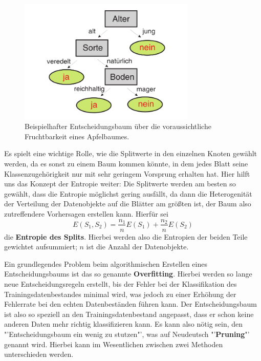 \begin{figure}[ht]
	\centering
	\includegraphics[width=0.75\textwidth]{Figures/decision_tree}
	\caption[Entscheidungsbaum Beispiel]{Beispielhafter Entscheidungsbaum über die
	voraussichtliche Fruchtbarkeit eines Apfelbaumes.\footnotemark}
	\label{fig:decision_tree}
\end{figure}

Es spielt eine wichtige Rolle, wie die Splitwerte in den einzelnen Knoten gewählt
werden, da es sonst zu einem Baum kommen könnte, in dem jedes Blatt seine 
Klassenzugehörigkeit nur mit sehr geringem Vorsprung erhalten hat. Hier hilft
uns das Konzept der Entropie weiter: Die Splitwerte werden am besten so gewählt, dass die
Entropie möglichst gering ausfällt, da dann die Heterogenität der Verteilung der
Datenobjekte auf die Blätter am größten ist, der Baum also zutreffendere Vorhersagen
erstellen kann. Hierfür sei
\[
	E(S_1, S_2) = \frac{n_1}{n} E(S_1) + \frac{n_2}{n} E(S_2)
\]
die \textbf{Entropie des Splits}. Hierbei werden also die Entropien der beiden
Teile gewichtet aufsummiert; \(n\) ist die Anzahl der Datenobjekte.

Ein grundlegendes Problem beim algorithmischen Erstellen eines Entscheidungsbaums
ist das so genannte \textbf{Overfitting}. Hierbei werden so lange neue
Entscheidungsregeln erstellt, bis der Fehler bei der Klassifikation des
Trainingsdatenbestandes minimal wird, was jedoch zu einer Erhöhung der Fehlerrate
bei den echten Datenbeständen führen kann. Der Entscheidungsbaum ist also so
speziell an den Trainingsdatenbestand angepasst, dass er schon keine anderen Daten
mehr richtig klassifizieren kann. Es kann also nötig sein, den "'Entscheidungsbaum
ein wenig zu stutzen"', was auf Neudeutsch "'\textbf{Pruning}"' genannt wird. Hierbei
kann im Wesentlichen zwischen zwei Methoden unterschieden werden.

